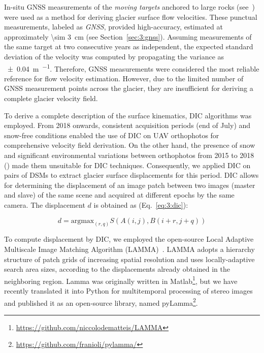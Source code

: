 In-situ GNSS measurements of the \textit{moving targets} anchored to large rocks (see~) were used as a method for deriving glacier surface flow velocities.
These punctual measurements, labeled as \textit{GNSS}, provided high-accuracy, 
estimated at approximately \qty{\sim 3}{\centi\meter} (see Section~\ref{sec:3:gnss}).
Assuming measurements of the same target at two consecutive years as independent, the expected standard deviation 
of the velocity was computed by propagating the variance as \qty{\pm 0.04}{\meter\per\year}.
Therefore, GNSS measurements were considered the most reliable reference for flow velocity estimation.
However, due to the limited number of GNSS measurement points across the glacier, they are insufficient 
for deriving a complete glacier velocity field.

To derive a complete description of the surface kinematics, DIC algorithms was employed. 
From 2018 onwards, consistent acquisition periods (end of July) and snow-free conditions enabled the use of DIC on UAV orthophotos for comprehensive velocity field derivation.
On the other hand, the presence of snow and significant environmental variations between orthophotos from 2015 to 2018
() made them unsuitable for DIC techniques.
Consequently, we applied DIC on pairs of DSMs \citep{Gindraux2019} to extract glacier surface displacements for this period.
DIC allows for determining the displacement of an image patch between two images (master and slave) of the same scene and acquired at different epochs by the same camera. The displacement \(d\) is obtained as  (Eq.~\ref{eq:3:dic}):

\begin{equation}
  d = \text{argmax}_{(r,q)} S(A(i,j),B(i+r,j+q))
  \label{eq:3:dic}
\end{equation}


To compute displacement by DIC, we employed the open-source Local Adaptive Multiscale Image Matching Algorithm (LAMMA)~\citep{Dematteis2022}.
LAMMA adopts a hierarchy structure of patch grids of increasing spatial resolution and uses locally-adaptive search area sizes, according to the displacements already
obtained in the neighboring region.
Lamma was originally written in Matlab\footnote{\url{https://github.com/niccolodematteis/LAMMA}}, but we have 
recently translated it into Python for multitemporal processing of stereo images \citep{ioli2024deep} and 
published it as an open-source library, named pyLamma\footnote{\url{https://github.com/franioli/pylamma/}}.


